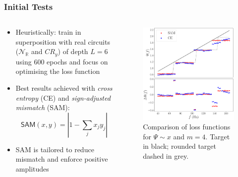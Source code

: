 \documentclass{beamer}
\begin{document}
\begin{frame}
\frametitle{Initial Tests}
\begin{columns}
\begin{column}{0.5\textwidth}
\begin{itemize}
\item \alert{Heuristically}: train in superposition with real circuits ($\mathcal{N}_\mathbb{R}$ and $CR_y$) of depth $L =6$ using 600 epochs and \alert{focus} on optimising the \alert{loss function}
\item Best results achieved with \emph{cross entropy} (\alert{CE}) and \emph{sign-adjusted mismatch} (\alert{SAM}):
\begin{equation}
\mathsf{SAM}(x,y) = \left\vert 1 - \sum_j x_j y_j \right \vert 
\end{equation}
\item SAM is tailored to reduce mismatch and enforce positive amplitudes
\end{itemize}
\end{column}
\begin{column}{0.5\textwidth}
\begin{figure}[h]
\centering
\includegraphics[width=\textwidth]{im/phase_loss_comp_linear_m4}
\caption{Comparison of loss functions for $\Psi \sim x$ and $m=4$. Target in black; rounded target dashed in grey.}
\end{figure}
\end{column}
\end{columns}
\end{frame}
\end{document}
